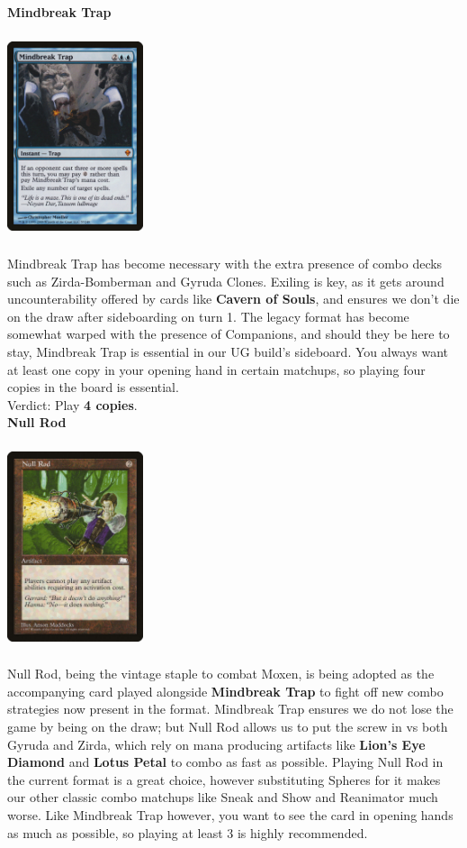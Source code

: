 \documentclass{report}
\begin{document}
\textbf{Mindbreak Trap}
\begin{center}
\includegraphics [width = 4cm, height = 6cm] {mindbreak-trap}
\end{center}
Mindbreak Trap has become necessary with the extra presence of combo decks such as Zirda-Bomberman and Gyruda Clones. Exiling is key, as it gets around uncounterability offered by cards like \textbf{Cavern of Souls}, and ensures we don't die on the draw after sideboarding on turn 1. The legacy format has become somewhat warped with the presence of Companions, and should they be here to stay, Mindbreak Trap is essential in our UG build's sideboard. You always want at least one copy in your opening hand in certain matchups, so playing four copies in the board is essential.\\
Verdict: Play \textbf{4 copies}.\\
\newpage
\textbf{Null Rod}
\begin{center}
\includegraphics [width = 4cm, height = 6cm] {null-rod}
\end{center}
Null Rod, being the vintage staple to combat Moxen, is being adopted as the accompanying card played alongside \textbf{Mindbreak Trap} to fight off new combo strategies now present in the format. Mindbreak Trap ensures we do not lose the game by being on the draw; but Null Rod allows us to put the screw in vs both Gyruda and Zirda, which rely on mana producing artifacts like \textbf{Lion's Eye Diamond} and \textbf{Lotus Petal} to combo as fast as possible. Playing Null Rod in the current format is a great choice, however substituting Spheres for it makes our other classic combo matchups like Sneak and Show and Reanimator much worse. Like Mindbreak Trap however, you want to see the card in opening hands as much as possible, so playing at least 3 is highly recommended.\\
\end{document}
